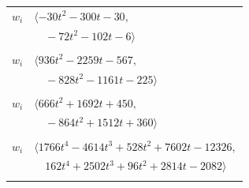 \documentclass[11pt]{article}
\begin{document}
\begin{longtable}{@{}ll@{}}
$w_i$ & $\langle -30t^{2}-300t-30,$\\
 & $\quad -72t^{2}-102t-6\rangle$\\
\addlinespace[2pt]
\multicolumn{2}{@{}p{0.97\textwidth}@{}}{$i=4$, $D_i=1$, $\rho_{ij}$: $6{:}3, \allowbreak 7{:}2, \allowbreak 16{:}3, \allowbreak 20{:}3, \allowbreak 25{:}1, \allowbreak 28{:}2, \allowbreak 29{:}3, \allowbreak 31{:}1, \allowbreak 35{:}2, \allowbreak 38{:}2, \allowbreak 42{:}3, \allowbreak 44{:}3, \allowbreak 57{:}3, \allowbreak 59{:}3, \allowbreak 67{:}2, \allowbreak 73{:}2, \allowbreak 75{:}2, \allowbreak 81{:}2$}\\
$w_i$ & $\langle 936t^{2}-2259t-567,$\\
 & $\quad -828t^{2}-1161t-225\rangle$\\
\addlinespace[2pt]
\multicolumn{2}{@{}p{0.97\textwidth}@{}}{$i=5$, $D_i=1$, $\rho_{ij}$: $9{:}2, \allowbreak 12{:}1, \allowbreak 13{:}2, \allowbreak 14{:}3, \allowbreak 16{:}3, \allowbreak 17{:}3, \allowbreak 25{:}3, \allowbreak 26{:}1, \allowbreak 27{:}2, \allowbreak 35{:}3, \allowbreak 36{:}2, \allowbreak 39{:}2, \allowbreak 63{:}3, \allowbreak 66{:}3, \allowbreak 67{:}3, \allowbreak 72{:}3$}\\
$w_i$ & $\langle 666t^{2}+1692t+450,$\\
 & $\quad -864t^{2}+1512t+360\rangle$\\
\addlinespace[2pt]
\multicolumn{2}{@{}p{0.97\textwidth}@{}}{$i=6$, $D_i=1$, $\rho_{ij}$: $4{:}1, \allowbreak 10{:}1, \allowbreak 11{:}2, \allowbreak 14{:}1, \allowbreak 20{:}3, \allowbreak 25{:}1, \allowbreak 28{:}3, \allowbreak 30{:}1, \allowbreak 32{:}1, \allowbreak 33{:}2, \allowbreak 35{:}2, \allowbreak 40{:}3, \allowbreak 41{:}2, \allowbreak 42{:}3, \allowbreak 48{:}1, \allowbreak 51{:}2, \allowbreak 52{:}3, \allowbreak 53{:}2, \allowbreak 56{:}2, \allowbreak 64{:}3, \allowbreak 66{:}2, \allowbreak 80{:}1$}\\
$w_i$ & $\langle 1766t^{4}-4614t^{3}+528t^{2}+7602t-12326,$\\
 & $\quad 162t^{4}+2502t^{3}+96t^{2}+2814t-2082\rangle$\\
\addlinespace[2pt]
\multicolumn{2}{@{}p{0.97\textwidth}@{}}{$i=7$, $D_i=1$, $\rho_{ij}$: $3{:}1, \allowbreak 4{:}2, \allowbreak 11{:}3, \allowbreak 28{:}3, \allowbreak 29{:}1, \allowbreak 32{:}2, \allowbreak 35{:}3, \allowbreak 38{:}1, \allowbreak 39{:}2, \allowbreak 40{:}3, \allowbreak 41{:}2, \allowbreak 42{:}2, \allowbreak 43{:}1, \allowbreak 48{:}1, \allowbreak 50{:}2, \allowbreak 53{:}3, \allowbreak 55{:}3, \allowbreak 57{:}1, \allowbreak 62{:}2, \allowbreak 63{:}3, \allowbreak 65{:}2, \allowbreak 75{:}1, \allowbreak 77{:}3, \allowbreak 78{:}3$}\\

\end{longtable}
\end{document}
